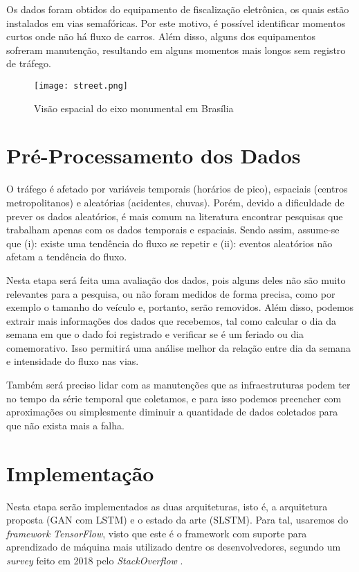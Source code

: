 Os dados foram obtidos do equipamento de fiscalização eletrônica, os quais estão instalados em vias semafóricas. Por este motivo, é possível identificar momentos curtos onde não há fluxo de carros. Além disso, alguns dos equipamentos sofreram manutenção, resultando em alguns momentos mais longos sem registro de tráfego.

\begin{figure}[t]
    \centering
    \texttt{[image: street.png]}
    \label{figure:eixo}
    \caption{Visão espacial do eixo monumental em Brasília}
\end{figure}

\section{Pré-Processamento dos Dados}

O tráfego é afetado por variáveis temporais (horários de pico), espaciais (centros metropolitanos) e aleatórias (acidentes, chuvas). Porém, devido a dificuldade de prever os dados aleatórios, é mais comum na literatura encontrar pesquisas que trabalham apenas com os dados temporais e espaciais. Sendo assim, assume-se que (i): existe uma tendência do fluxo se repetir e (ii): eventos aleatórios não afetam a tendência do fluxo.

Nesta etapa será feita uma avaliação dos dados, pois alguns deles não são muito relevantes para a pesquisa, ou não foram medidos de forma precisa, como por exemplo o tamanho do veículo e, portanto, serão removidos. Além disso, podemos extrair mais informações dos dados que recebemos, tal como calcular o dia da semana em que o dado foi registrado e verificar se é um feriado ou dia comemorativo. Isso permitirá uma análise melhor da relação entre dia da semana e intensidade do fluxo nas vias.

Também será preciso lidar com as manutenções que as infraestruturas podem ter no tempo da série temporal que coletamos, e para isso podemos preencher com aproximações ou simplesmente diminuir a quantidade de dados coletados para que não exista mais a falha.

\section{Implementação}

Nesta etapa serão implementados as duas arquiteturas, isto é, a arquitetura proposta (\acrshort{GAN} com \acrshort{LSTM}) e o estado da arte (\acrshort{SLSTM}). Para tal, usaremos do \textit{framework} \textit{TensorFlow}, visto que este é o framework com suporte para aprendizado de máquina mais utilizado dentre os desenvolvedores, segundo um \textit{survey} feito em 2018 pelo \textit{StackOverflow} \cite{stack_2018}.

